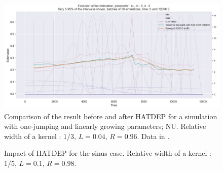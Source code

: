 \begin{figure}
\centering
\includegraphics[width = 0.90 \textwidth]{../imag/chap3/3/L.png}
\caption{Comparison of the result before and after HATDEP for a simulation with one-jumping and linearly growing parameters; NU. Relative width of a kernel : $1/3$, $L = 0.04$, $R = 0.96$. Data in \protect {}.}
\label{fig:first_estimate_3_nu}
\end{figure}















\begin{figure}
\centering
{} 
\caption{Impact of HATDEP for  the sinus case. Relative width of a kernel : $1/5$, $L = 0.1$, $R = 0.98$.}
\label{fig:compar_kernels_4}
\end{figure}

